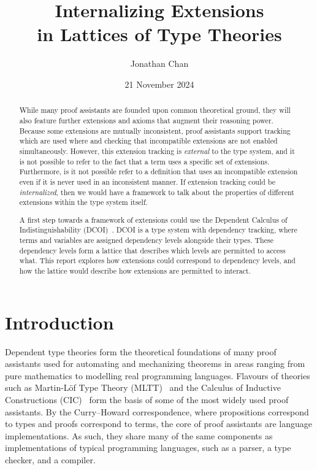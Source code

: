 \documentclass{article}
\title{\textbf{Internalizing Extensions \\ in Lattices of Type Theories}}
\author{Jonathan Chan}
\date{21 November 2024}
\begin{document}
\maketitle

\begin{abstract}
  While many proof assistants are founded upon common theoretical ground,
  they will also feature further extensions and axioms
  that augment their reasoning power.
  Because some extensions are mutually inconsistent,
  proof assistants support tracking which are used where
  and checking that incompatible extensions are not enabled simultaneously.
  However, this extension tracking is \emph{external} to the type system,
  and it is not possible to refer to the fact that a term uses a specific set of extensions.
  Furthermore, is it not possible refer to a definition that uses an incompatible extension
  even if it is never used in an inconsistent manner.
  If extension tracking could be \emph{internalized},
  then we would have a framework to talk about the properties of different extensions
  within the type system itself.

  A first step towards a framework of extensions could use
  the Dependent Calculus of Indistinguishability (DCOI)~\citep{dcoi}.
  DCOI is a type system with dependency tracking,
  where terms and variables are assigned dependency levels alongside their types.
  These dependency levels form a lattice that describes
  which levels are permitted to access what.
  This report explores how extensions could correspond to dependency levels,
  and how the lattice would describe how extensions are permitted to interact.
\end{abstract}

\section{Introduction}

\iffalse
Dependent type theories form the theoretical foundations of many proof assistants
used for automating and mechanizing theorems in areas ranging from pure mathematics
to modelling real programming languages.
Flavours of theories such as Martin-L\"of Type Theory (MLTT)~\citep{mltt}
and the Calculus of Inductive Constructions (CIC)~\citep{cic}
form the basis of some of the most widely used proof assistants.
By the Curry--Howard correspondence,
where propositions correspond to types and proofs correspond to terms,
the core of proof assistants are language implementations.
As such, they share many of the same components
as implementations of typical programming languages,
such as a parser, a type checker, and a compiler.
\end{document}

